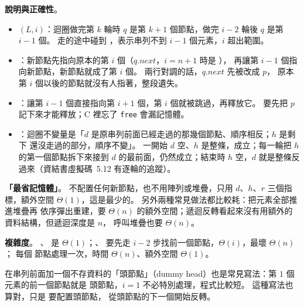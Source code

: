 \begin{pastsoln}
\textbf{說明與正確性}。
\begin{itemize}
\item {}$(L, i)$：迴圈做完第 $k$ 輪時 $q$ 是第 $k + 1$ 個節點，做完 $i - 2$ 輪後
$q$ 是第 $i - 1$ 個。 走的途中碰到 \NIL，表示串列不到 $i - 1$ 個元素，$i$ 超出範圍。
\item {}：新節點先指向原本的第 $i$ 個（$q.\mathit{next}$，$i = n + 1$ 時是 \NIL），
再讓第 $i - 1$ 個指向新節點，新節點就成了第 $i$ 個。 兩行對調的話，$q.\mathit{next}$ 先被改成 $p$，
原本第 $i$ 個以後的節點就沒有人指著，整段遺失。
\item {}：讓第 $i - 1$ 個直接指向第 $i + 1$ 個，第 $i$ 個就被跳過，再釋放它。 要先把
$p$ 記下來才能釋放；C 裡忘了 \texttt{free} 會漏記憶體。
\item {}：迴圈不變量是「$d$ 是原串列前面已經走過的那幾個節點、順序相反；$h$ 是剩下
還沒走過的部分，順序不變」。 一開始 $d$ 空、$h$ 是整條，成立；每一輪把 $h$ 的第一個節點拆下來接到
$d$ 的最前面，仍然成立；結束時 $h$ 空，$d$ 就是整條反過來（資結書虛擬碼~5.12 有逐輪的追蹤）。
\end{itemize}

\textbf{「最省記憶體」}。  不配置任何新節點，也不用陣列或堆疊，只用 $d$、$h$、$r$
三個指標，額外空間 $\Theta(1)$，這是最少的。 另外兩種常見做法都比較耗：把元素全部推進堆疊再
依序彈出重建，要 $\Theta(n)$ 的額外空間；遞迴反轉看起來沒有用額外的資料結構，但遞迴深度是 $n$，
呼叫堆疊也要 $\Theta(n)$。

\textbf{複雜度}。 、 是 $\Theta(1)$；、
 要先走 $i - 2$ 步找前一個節點，$\Theta(i)$，最壞 $\Theta(n)$； 每個
節點處理一次，時間 $\Theta(n)$、額外空間 $\Theta(1)$。

在串列前面加一個不存資料的「頭節點」（dummy head）也是常見寫法：第 $1$ 個元素的前一個節點就是
頭節點，$i = 1$ 不必特別處理，程式比較短。 這種寫法也算對，只是  要配置頭節點，
 從頭節點的下一個開始反轉。
\end{pastsoln}
